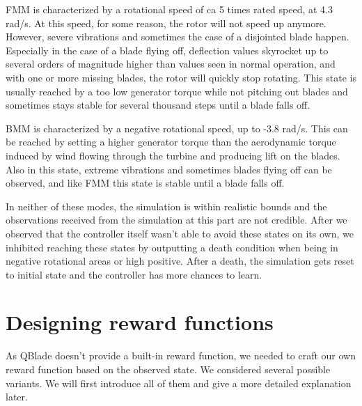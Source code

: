 \documentclass[hyperref,final,beleg]{cgvpub}
\begin{document}
\ac{FMM} is characterized by a rotational speed of ca 5 times rated speed, at 4.3 rad/s. At this speed, for some reason, the rotor will not speed up anymore. However, severe vibrations and sometimes the case of a disjointed blade happen. Especially in the case of a blade flying off, deflection values skyrocket up to several orders of magnitude higher than values seen in normal operation, and with one or more missing blades, the rotor will quickly stop rotating. This state is usually reached by a too low generator torque while not pitching out blades and sometimes stays stable for several thousand steps until a blade falls off.

\ac{BMM} is characterized by a negative rotational speed, up to -3.8 rad/s. This can be reached by setting a higher generator torque than the aerodynamic torque induced by wind flowing through the turbine and producing lift on the blades. Also in this state, extreme vibrations and sometimes blades flying off can be observed, and like \ac{FMM} this state is stable until a blade falls off. 

In neither of these modes, the simulation is within realistic bounds and the observations received from the simulation at this part are not credible. After we observed that the controller itself wasn't able to avoid these states on its own, we inhibited reaching these states by outputting a death condition when being in negative rotational areas or high positive. After a death, the simulation gets reset to initial state and the controller has more chances to learn.


\section{Designing reward functions}
\label{sec:rewardfunctions}

As QBlade doesn't provide a built-in reward function, we needed to craft our own reward function based on the observed state. We considered several possible variants. We will first introduce all of them and give a more detailed explanation later.\\
\end{document}

